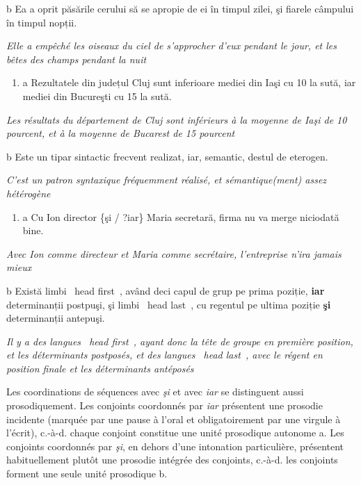   b  Ea a oprit păsările cerului să se apropie de ei în timpul zilei, şi fiarele câmpului în timpul nopții.

{\itshape
Elle a empêché les oiseaux du ciel de s'approcher d'eux pendant le jour, et les bêtes des champs pendant la nuit} 


\begin{enumerate}
\item \label{bkm:Ref302402697}a  Rezultatele din județul Cluj sunt inferioare mediei din Iaşi cu 10 la sută, iar mediei din Bucureşti cu 15 la sută.


\end{enumerate}
{\itshape
Les résultats du département de Cluj sont inférieurs à la moyenne de Iaşi de 10 pourcent, et à la moyenne de Bucarest de 15 pourcent} 

  b  Este un tipar sintactic frecvent realizat, iar, semantic, destul de eterogen.

{\itshape
C'est un patron syntaxique fréquemment réalisé, et sémantique(ment) assez hétérogène} 


\begin{enumerate}
\item \label{bkm:Ref300049706}a  Cu Ion director \{şi / ?iar\} Maria secretară, firma nu va merge niciodată bine.


\end{enumerate}
{\itshape
Avec Ion comme directeur et Maria comme secrétaire, l'entreprise n'ira jamais mieux}

  b  Există limbi {\guillemotleft}~head first~{\guillemotright}, având deci capul de grup pe prima poziție, \textbf{iar} determinanții postpuşi, şi limbi {\guillemotleft}~head last~{\guillemotright}, cu regentul pe ultima poziție \textbf{şi} determinanții antepuşi.

{\itshape
Il y a des langues {\guillemotleft}~head first~{\guillemotright}, ayant donc la tête de groupe en première position, et les déterminants postposés, et des langues {\guillemotleft}~head last~{\guillemotright}, avec le régent en position finale et les déterminants antéposés} 

Les coordinations de séquences avec \textit{şi} et avec \textit{iar} se distinguent aussi prosodiquement. Les conjoints coordonnés par \textit{iar} présentent une prosodie incidente (marquée par une pause à l'oral et obligatoirement par une virgule à l'écrit), c.-à-d. chaque conjoint constitue une unité prosodique autonome a. Les conjoints coordonnés par \textit{şi}, en dehors d'une intonation particulière, présentent habituellement plutôt une prosodie intégrée des conjoints, c.-à-d. les conjoints forment une seule unité prosodique b.


